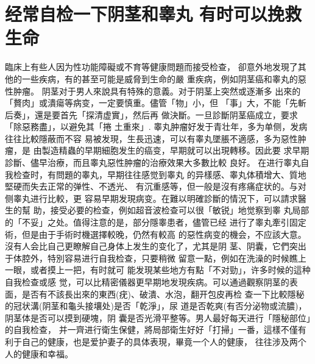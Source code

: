 \documentclass[12pt,UTF8]{ctexbook}
\begin{document}
\section{经常自检一下阴茎和睾丸
有时可以挽救生命}
臨床上有些人因为性功能障礙或不育等健康問題而接受检查，
卻意外地发現了其他的一些疾病，有的甚至可能是威脅到生命的嚴
重疾病，例如阴茎癌和睾丸的惡性肿瘤。
阴茎对于男人來說具有特殊的意義。对于阴茎上突然或逐漸多
出來的「贅肉」或潰瘍等病变，一定要慎重。儘管「物」小，但
「事」大，不能「先斬后奏」，還是要首先「探清虚實」，然后再
做決斷。一旦診斷阴茎癌成立，要求「除惡務盡」，以避免其「捲
土重來」.
睾丸肿瘤好发于青壮年，多为单侧，发病往往比較隱蔽而不容
易被发現，生長迅速，可以有睾丸墜脹不適感，多为惡性肿瘤，是
由製造精蟲的早期細胞发生的癌变，早期就可以出現轉移。因此要
求早期診斷、儘早治療，而且睾丸惡性肿瘤的治療效果大多數比較
良好。
在进行睾丸自我检查时，有問題的睾丸，早期往往感觉到睾丸
的异樣感、睾丸体積增大、質地堅硬而失去正常的弹性、不透光、
有沉重感等，但一般是沒有疼痛症状的。与对侧睾丸进行比較，更
容易早期发現病变。在難以明確診斷的情況下，可以請求醫生的幫
助，接受必要的检查，例如超音波检查可以很「敏锐」地觉察到睾
丸局部的「不妥」之处。值得注意的是，部分隱睾患者，儘管已经
进行了睾丸牽引固定術，但是由于手術时機選擇較晚，仍然有較高
的惡性病变的機会，不应該大意。
沒有人会比自己更瞭解自己身体上发生的变化了，尤其是阴
茎、阴囊，它們突出于体腔外，特別容易进行自我检查，只要稍微
留意一點，例如在洗澡的时候瞧上一眼，或者摸上一把，有时就可
能发現某些地方有點「不对勁」，许多时候的這种自我检查或感
觉，可以比精密儀器更早期地发現疾病。可以通過觀察阴茎的表
面，是否有不該長出來的東西(疣)、破潰、水泡，翻开包皮再检
查一下比較隱秘的冠状溝(阴茎和龜头接壤处)是否「乾淨」，尿
道是否乾爽(有否分泌物或流膿)，阴茎体是否可以摸到硬塊，阴
囊是否光滑平整等。男人最好每天进行「隱秘部位」的自我检查，
并一齊进行衛生保健，將局部衛生好好「打掃」一番，這樣不僅有
利于自己的健康，也是爱护妻子的具体表現，畢竟一个人的健康，
往往涉及两个人的健康和幸福。
\end{document}
